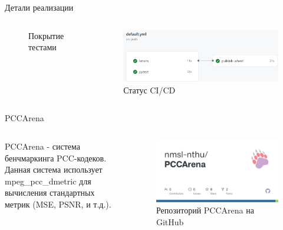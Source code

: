 \documentclass[aspectratio=169]{beamer}
\begin{document}
\begin{frame}{Детали реализации}
\begin{columns}
{\begin{minipage}{1.20\textwidth}
\begin{figure}
              \caption{Покрытие тестами}
            \end{figure}
            \vspace{-1\baselineskip}
            \begin{figure}
              \centering
              \includegraphics[width=0.7\linewidth]{assets/actions_status.png}
              \caption{Статус CI/CD}
            \end{figure}
          \end{minipage}
        }
    \end{columns}
  \end{frame}

  \begin{frame}{PCCArena}
    \begin{columns}
        PCCArena - система бенчмаркинга PCC-кодеков. Данная система использует
        mpeg\_pcc\_dmetric для вычисления стандартных метрик (MSE, PSNR, и
        т.д.).
        \begin{figure}
          \centering
          \includegraphics[width=\linewidth]{assets/pcc_arena_github.jpg}
          \caption{Репозиторий PCCArena на GitHub}
        \end{figure}
     \end{columns}

  \end{frame}
\end{document}
